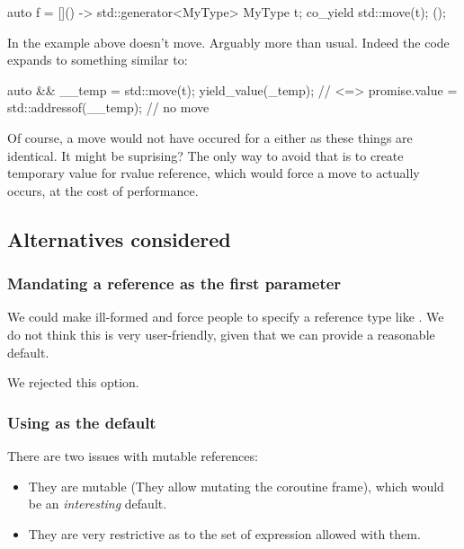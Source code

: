 \documentclass{wg21}
\begin{document}
\begin{colorblock}
auto f = []() -> std::generator<MyType> {
    MyType t;
    co_yield std::move(t);
}();
\end{colorblock}

In the example above  doesn't move. Arguably more than usual.
Indeed the code expands to something similar to:

\begin{colorblock}

auto && __temp = std::move(t);
yield_value(_temp); // <=> promise.value = std::addressof(__temp); // no move

\end{colorblock}

Of course, a move would not have occured for a  either as these things are identical.
It might be suprising?
The only way to avoid that is to create temporary value for rvalue reference, which would force a move to actually occurs,
at the cost of performance.


\subsection{Alternatives considered}

\subsubsection{Mandating a reference as the first parameter}

We could make  ill-formed and force people to specify a reference type like .
We do not think this is very user-friendly, given that we can provide a reasonable default.

We rejected this option.

\subsubsection{Using  as the default}

There are two issues with mutable references:
\begin{itemize}
\item They are mutable (They allow mutating the coroutine frame), which would be an \emph{interesting} default.
\item They are very restrictive as to the set of  expression allowed with them.
\end{itemize}
\end{document}
